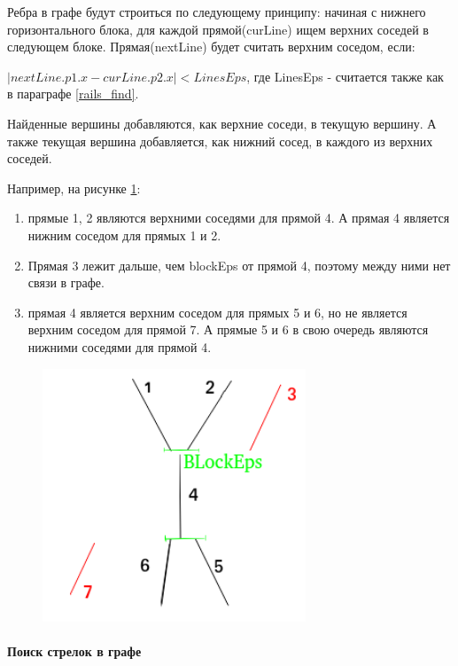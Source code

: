 Ребра в графе будут строиться по следующему принципу: начиная с нижнего горизонтального блока, для каждой прямой(curLine) ищем верхних соседей в следующем блоке. Прямая(nextLine) будет считать верхним соседом, если:

$|nextLine.p1.x - curLine.p2.x| < LinesEps$, 
где LinesEps - считается также как в параграфе \ref{rails_find}.

Найденные вершины добавляются, как верхние соседи, в текущую вершину. А также текущая вершина добавляется, как нижний сосед, в каждого из верхних соседей.

Например, на рисунке \ref{fig:neighscheck}:
\begin{enumerate}
	\item прямые 1, 2 являются верхними соседями для прямой 4. А прямая 4 является нижним соседом для прямых 1 и 2.
	\item Прямая 3 лежит дальше, чем blockEps от прямой 4, поэтому между ними нет связи в графе.
	\item прямая 4 является верхним соседом для прямых 5 и 6, но не является верхним соседом для прямой 7. А прямые 5 и 6 в свою очередь являются нижними соседями для прямой 4.
\end{enumerate}
\begin{figure}[!h]
	\centering
	\includegraphics[width=0.7\textwidth]{pictures/neighs_check}
	\caption[Создание ребер]{}
	\label{fig:neighscheck}
\end{figure}

\paragraph{Поиск стрелок в графе}

